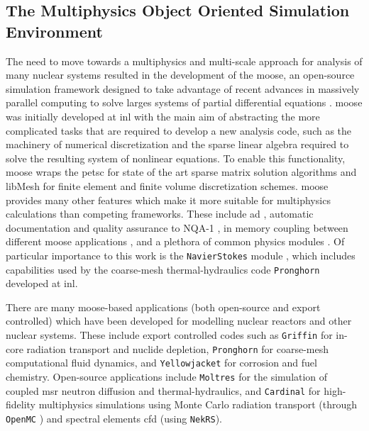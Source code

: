 \subsection{The Multiphysics Object Oriented Simulation Environment}
\label{introduction:ms:moose}

The need to move towards a multiphysics and multi-scale approach for analysis of many nuclear systems resulted in the development of the \acrshort{moose}, an open-source simulation framework designed to take advantage of recent advances in massively parallel computing to solve larges systems of partial differential equations \cite{moose_0,moose_1,moose_2}. \acrshort{moose} was initially developed at \acrfull{inl} with the main aim of abstracting the more complicated tasks that are required to develop a new analysis code, such as the machinery of numerical discretization and the sparse linear algebra required to solve the resulting system of nonlinear equations. To enable this functionality, \acrshort{moose} wraps the \acrfull{petsc} \cite{petsc_manual} for state of the art sparse matrix solution algorithms and libMesh \cite{libmesh} for finite element and finite volume discretization schemes. \acrshort{moose} provides many other features which make it more suitable for multiphysics calculations than competing frameworks. These include \acrfull{ad} \cite{moose_ad}, automatic documentation and quality assurance to NQA-1 \cite{moose_civet}, in memory coupling between different \acrshort{moose} applications \cite{moose_coupling}, and a plethora of common physics modules \cite{moose_ns_summary,moose_th,moose_reactor}. Of particular importance to this work is the \texttt{NavierStokes} module \cite{moose_ns_summary,moose_ns_crab}, which includes capabilities used by the coarse-mesh thermal-hydraulics code \texttt{Pronghorn} developed at \acrshort{inl}.

There are many \acrshort{moose}-based applications (both open-source and export controlled) which have been developed for modelling nuclear reactors and other nuclear systems. These include export controlled codes such as \texttt{Griffin} \cite{griffin_sdp} for in-core radiation transport and nuclide depletion, \texttt{Pronghorn} \cite{moose_ns_crab} for coarse-mesh computational fluid dynamics, and \texttt{Yellowjacket} \cite{yellowjacket} for corrosion and fuel chemistry. Open-source applications include \texttt{Moltres} \cite{moltres} for the simulation of coupled \acrshort{msr} neutron diffusion and thermal-hydraulics, and \texttt{Cardinal} \cite{cardinal} for high-fidelity multiphysics simulations using Monte Carlo radiation transport (through \texttt{OpenMC} \cite{openmc}) and spectral elements \acrfull{cfd} (using \texttt{NekRS}). 

